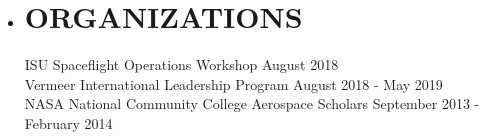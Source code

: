 \documentclass[overlapped, 11pt]{res}
\begin{document}
\begin{resume}
\begin{itemize}
        \item[]\section{ORGANIZATIONS}
            ISU Spaceflight Operations Workshop
                \hfill August 2018 \\
            Vermeer International Leadership Program
                \hfill August 2018 - May 2019 \\
            NASA National Community College Aerospace Scholars
                \hfill September 2013 - February 2014
        
        \end{itemize}
    \end{resume}
\end{document}
